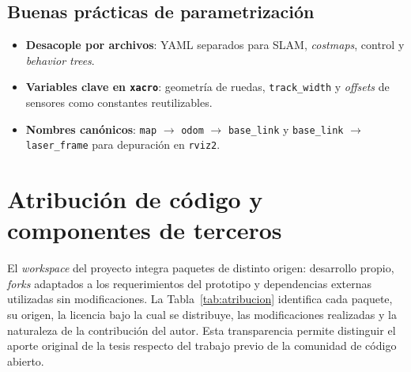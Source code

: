 \subsection{Buenas prácticas de parametrización}
\begin{itemize}
  \item \textbf{Desacople por archivos}: YAML separados para SLAM, \textit{costmaps}, control y \textit{behavior trees}.
  \item \textbf{Variables clave en \texttt{xacro}}: geometría de ruedas, \texttt{track\_width} y \textit{offsets} de sensores como constantes reutilizables.
\item \textbf{Nombres canónicos}: 
      \verb|map| $\rightarrow$ \verb|odom| $\rightarrow$ \verb|base_link| 
      y \verb|base_link| $\rightarrow$ \verb|laser_frame| para depuración en \texttt{rviz2}.
\end{itemize}

\section{Atribución de código y componentes de terceros}
\label{sec:atribucion}
 
El \textit{workspace} del proyecto integra paquetes de distinto origen: desarrollo propio, \emph{forks} adaptados a los requerimientos del prototipo y dependencias externas utilizadas sin modificaciones. La Tabla~\ref{tab:atribucion} identifica cada paquete, su origen, la licencia bajo la cual se distribuye, las modificaciones realizadas y la naturaleza de la contribución del autor. Esta transparencia permite distinguir el aporte original de la tesis respecto del trabajo previo de la comunidad de código abierto.
 
